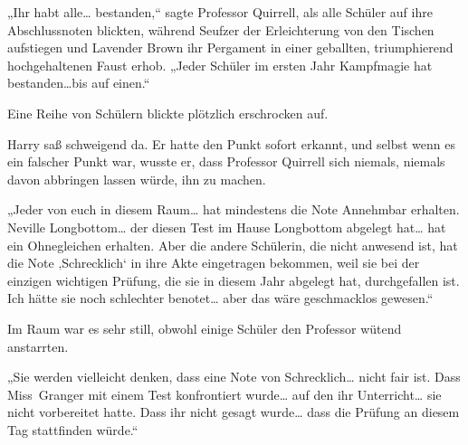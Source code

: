 „Ihr habt alle… bestanden,“ sagte Professor Quirrell, als alle Schüler auf ihre Abschlussnoten blickten, während Seufzer der Erleichterung von den Tischen aufstiegen und Lavender Brown ihr Pergament in einer geballten, triumphierend hochgehaltenen Faust erhob.
„Jeder Schüler im ersten Jahr Kampfmagie hat bestanden…bis auf einen.“

Eine Reihe von Schülern blickte plötzlich erschrocken auf.

Harry saß schweigend da. Er hatte den Punkt sofort erkannt, und selbst wenn es ein falscher Punkt war, wusste er, dass Professor Quirrell sich niemals, niemals davon abbringen lassen würde, ihn zu machen.

„Jeder von euch in diesem Raum… hat mindestens die Note Annehmbar erhalten. Neville Longbottom… der diesen Test im Hause Longbottom abgelegt hat… hat ein Ohnegleichen erhalten. Aber die andere Schülerin, die nicht anwesend ist, hat die Note ‚Schrecklich‘ in ihre Akte eingetragen bekommen, weil sie bei der einzigen wichtigen Prüfung, die sie in diesem Jahr abgelegt hat, durchgefallen ist. Ich hätte sie noch schlechter benotet… aber das wäre geschmacklos gewesen.“

Im Raum war es sehr still, obwohl einige Schüler den Professor wütend anstarrten.

„Sie werden vielleicht denken, dass eine Note von Schrecklich… nicht fair ist. Dass Miss~Granger mit einem Test konfrontiert wurde… auf den ihr Unterricht… sie nicht vorbereitet hatte. Dass ihr nicht gesagt wurde… dass die Prüfung an diesem Tag stattfinden würde.“

